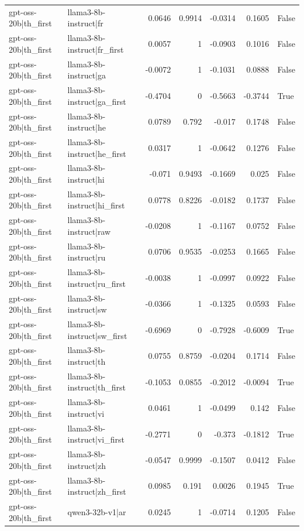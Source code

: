 \begin{table}
\begin{tabular}{l l r r r r l}
gpt-oss-20b|th_first & llama3-8b-instruct|fr & 0.0646 & 0.9914 & -0.0314 & 0.1605 & False \\
gpt-oss-20b|th_first & llama3-8b-instruct|fr_first & 0.0057 & 1 & -0.0903 & 0.1016 & False \\
gpt-oss-20b|th_first & llama3-8b-instruct|ga & -0.0072 & 1 & -0.1031 & 0.0888 & False \\
gpt-oss-20b|th_first & llama3-8b-instruct|ga_first & -0.4704 & 0 & -0.5663 & -0.3744 & True \\
gpt-oss-20b|th_first & llama3-8b-instruct|he & 0.0789 & 0.792 & -0.017 & 0.1748 & False \\
gpt-oss-20b|th_first & llama3-8b-instruct|he_first & 0.0317 & 1 & -0.0642 & 0.1276 & False \\
gpt-oss-20b|th_first & llama3-8b-instruct|hi & -0.071 & 0.9493 & -0.1669 & 0.025 & False \\
gpt-oss-20b|th_first & llama3-8b-instruct|hi_first & 0.0778 & 0.8226 & -0.0182 & 0.1737 & False \\
gpt-oss-20b|th_first & llama3-8b-instruct|raw & -0.0208 & 1 & -0.1167 & 0.0752 & False \\
gpt-oss-20b|th_first & llama3-8b-instruct|ru & 0.0706 & 0.9535 & -0.0253 & 0.1665 & False \\
gpt-oss-20b|th_first & llama3-8b-instruct|ru_first & -0.0038 & 1 & -0.0997 & 0.0922 & False \\
gpt-oss-20b|th_first & llama3-8b-instruct|sw & -0.0366 & 1 & -0.1325 & 0.0593 & False \\
gpt-oss-20b|th_first & llama3-8b-instruct|sw_first & -0.6969 & 0 & -0.7928 & -0.6009 & True \\
gpt-oss-20b|th_first & llama3-8b-instruct|th & 0.0755 & 0.8759 & -0.0204 & 0.1714 & False \\
gpt-oss-20b|th_first & llama3-8b-instruct|th_first & -0.1053 & 0.0855 & -0.2012 & -0.0094 & True \\
gpt-oss-20b|th_first & llama3-8b-instruct|vi & 0.0461 & 1 & -0.0499 & 0.142 & False \\
gpt-oss-20b|th_first & llama3-8b-instruct|vi_first & -0.2771 & 0 & -0.373 & -0.1812 & True \\
gpt-oss-20b|th_first & llama3-8b-instruct|zh & -0.0547 & 0.9999 & -0.1507 & 0.0412 & False \\
gpt-oss-20b|th_first & llama3-8b-instruct|zh_first & 0.0985 & 0.191 & 0.0026 & 0.1945 & True \\
gpt-oss-20b|th_first & qwen3-32b-v1|ar & 0.0245 & 1 & -0.0714 & 0.1205 & False \\

\end{tabular}
\end{table}
